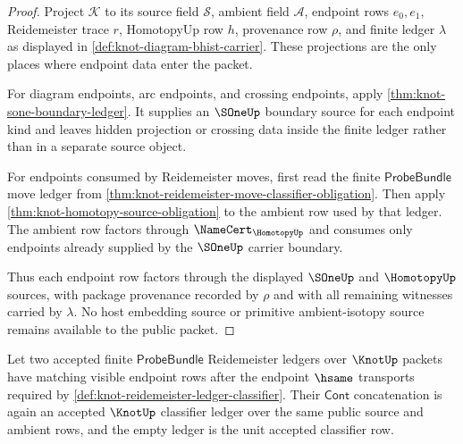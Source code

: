 \begin{proof}
Project $\mathcal{K}$ to its source field $\mathcal{S}$, ambient field
$\mathcal{A}$, endpoint rows $e_0,e_1$, Reidemeister trace $r$, HomotopyUp
row $h$, provenance row $\rho$, and finite ledger $\lambda$ as displayed in
\autoref{def:knot-diagram-bhist-carrier}. These projections are the only
places where endpoint data enter the packet.

For diagram endpoints, arc endpoints, and crossing endpoints, apply
\autoref{thm:knot-sone-boundary-ledger}. It supplies an $\SOneUp$ boundary
source for each endpoint kind and leaves hidden projection or crossing data
inside the finite ledger rather than in a separate source object.

For endpoints consumed by Reidemeister moves, first read the finite
$\mathsf{ProbeBundle}$ move ledger from
\autoref{thm:knot-reidemeister-move-classifier-obligation}. Then apply
\autoref{thm:knot-homotopy-source-obligation} to the ambient row used by that
ledger. The ambient row factors through $\NameCert_{\HomotopyUp}$ and consumes
only endpoints already supplied by the $\SOneUp$ carrier boundary.

Thus each endpoint row factors through the displayed $\SOneUp$ and
$\HomotopyUp$ sources, with package provenance recorded by $\rho$ and with
all remaining witnesses carried by $\lambda$. No host embedding source or
primitive ambient-isotopy source remains available to the public packet.
\end{proof}

\begin{theorem}\label{thm:knot-reidemeister-ledger-composition-closure}
Let two accepted finite $\mathsf{ProbeBundle}$ Reidemeister ledgers over
$\KnotUp$ packets have matching visible endpoint rows after the endpoint
$\hsame$ transports required by
\autoref{def:knot-reidemeister-ledger-classifier}. Their
$\mathsf{Cont}$ concatenation is again an accepted $\KnotUp$ classifier
ledger over the same public source and ambient rows, and the empty ledger is
the unit accepted classifier row.
\end{theorem}

